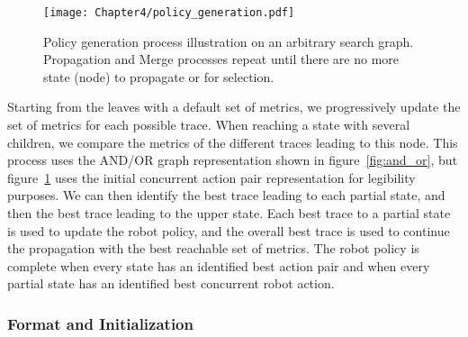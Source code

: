 \begin{figure}[h]
    \texttt{[image: Chapter4/policy\_generation.pdf]}
    \caption{Policy generation process illustration on an arbitrary search graph. Propagation and Merge processes repeat until there are no more state (node) to propagate or for selection.}
    \label{fig:policy_generation}
\end{figure}

Starting from the leaves with a default set of metrics, we progressively update the set of metrics for each possible trace. When reaching a state with several children, we compare the metrics of the different traces leading to this node. 
This process uses the AND/OR graph representation shown in figure~\ref{fig:and_or}, but figure~\ref{fig:policy_generation} uses the initial concurrent action pair representation for legibility purposes. 
We can then identify the best trace leading to each partial state, and then the best trace leading to the upper state. Each best trace to a partial state is used to update the robot policy, and the overall best trace is used to continue the propagation with the best reachable set of metrics. The robot policy is complete when every state has an identified best action pair and when every partial state has an identified best concurrent robot action. 






    \subsubsection*{Format and Initialization}

